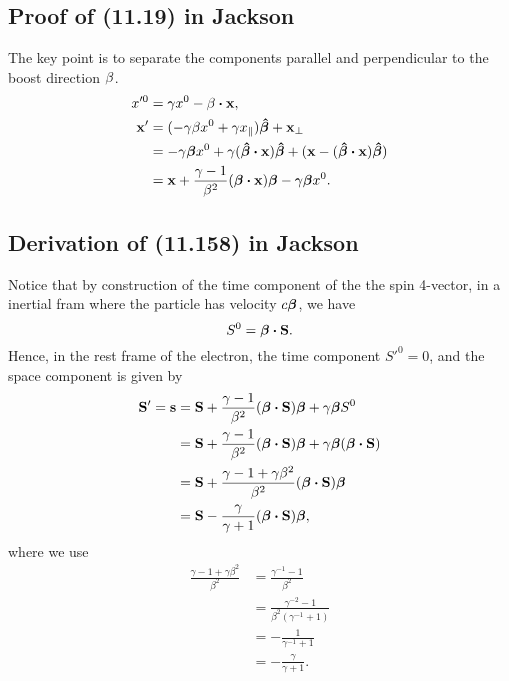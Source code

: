 \documentclass[10pt]{article}
\begin{document}
\subsection{Proof of (11.19) in Jackson}
The key point is to separate the components parallel and perpendicular to the boost direction $\vb{\beta}$.
\begin{align*}
	x'^0 &= \gamma x^0 - \vb{\beta} \vdot \vb{x}, \\
	\vb{x'} &= (- \gamma \beta x^0 + \gamma x_{\parallel}) \vu*{\beta} + \vb{x}_{\perp} \\
	&= -\gamma \vb*{\beta} x^0 + \gamma (\vu*{\beta} \vdot \vb{x}) \vu*{\beta} + (\vb{x} - (\vu*{\beta} \vdot \vb{x}) \vu*{\beta}) \\
	&= \vb{x} + \frac{\gamma - 1}{\beta^2} (\vb*{\beta} \vdot \vb{x}) \vb*{\beta} - \gamma \vb*{\beta} x^0.
\end{align*}

\subsection{Derivation of (11.158) in Jackson}
Notice that by construction of the time component of the the spin 4-vector, in a inertial fram where the particle has velocity $c \vb*{\beta}$, we have
\begin{equation}
	S^0 = \vb*{\beta} \vdot \vb{S}.
\end{equation}
Hence, in the rest frame of the electron, the time component $S'^0 = 0$, and the space component is given by
\begin{align*}
	\vb{S'} = \vb{s} &= \vb{S} + \frac{\gamma - 1}{\beta^2} (\vb*{\beta} \vdot \vb{S}) \vb*{\beta} + \gamma \vb*{\beta} S^0 \\
	&= \vb{S} + \frac{\gamma - 1}{\beta^2} (\vb*{\beta} \vdot \vb{S}) \vb*{\beta} + \gamma \vb*{\beta} (\vb*{\beta} \vdot \vb{S})\\
	&= \vb{S} + \frac{\gamma - 1 + \gamma \beta^2}{\beta^2} (\vb*{\beta} \vdot \vb{S}) \vb*{\beta} \\
	&= \vb{S} - \frac{\gamma}{\gamma + 1} (\vb*{\beta} \vdot \vb{S}) \vb*{\beta},
\end{align*}
where we use
\begin{align*}
	\frac{\gamma - 1 + \gamma \beta^2}{\beta^2} &= \frac{\gamma^{-1} -1}{\beta^2} \\
	&= \frac{\gamma^{-2} -1}{\beta^2 (\gamma^{-1} +1)} \\
	&= - \frac{1}{\gamma^{-1} + 1} \\
	&= - \frac{\gamma}{\gamma + 1}.
\end{align*}
\end{document}
